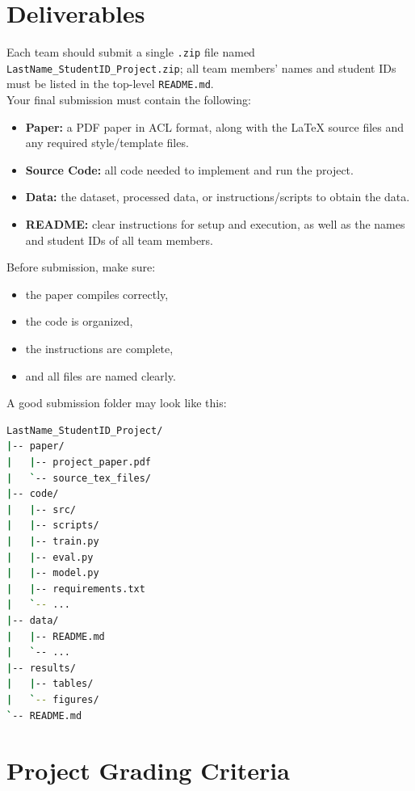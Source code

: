 \documentclass{article}
\begin{document}
\section{Deliverables}

Each team should submit a single \texttt{.zip} file named \texttt{LastName\_StudentID\_Project.zip}; all team members' names and student IDs must be listed in the top-level \texttt{README.md}.\\

\noindent Your final submission must contain the following:

\begin{itemize}
  \item \textbf{Paper:} a PDF paper in ACL format, along with the LaTeX source files and any required style/template files.
  \item \textbf{Source Code:} all code needed to implement and run the project.
  \item \textbf{Data:} the dataset, processed data, or instructions/scripts to obtain the data.
  \item \textbf{README:} clear instructions for setup and execution, as well as the names and student IDs of all team members.
\end{itemize}

\noindent Before submission, make sure:
\begin{itemize}
  \item the paper compiles correctly,
  \item the code is organized,
  \item the instructions are complete,
  \item and all files are named clearly.
\end{itemize}
A good submission folder may look like this:

\begin{lstlisting}[language=bash]
LastName_StudentID_Project/
|-- paper/
|   |-- project_paper.pdf
|   `-- source_tex_files/
|-- code/
|   |-- src/
|   |-- scripts/
|   |-- train.py
|   |-- eval.py
|   |-- model.py
|   |-- requirements.txt
|   `-- ...
|-- data/
|   |-- README.md
|   `-- ...
|-- results/
|   |-- tables/
|   `-- figures/
`-- README.md
\end{lstlisting}

\section{Project Grading Criteria}
\end{document}
